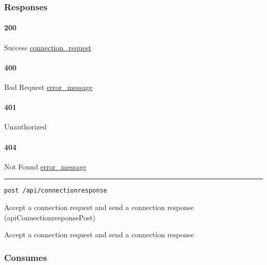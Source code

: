 \hypertarget{responses-162}{%
\subsubsection{Responses}\label{responses-162}}

\hypertarget{section-521}{%
\paragraph{200}\label{section-521}}

Success \protect\hyperlink{connection_request}{connection\_request}

\hypertarget{section-522}{%
\paragraph{400}\label{section-522}}

Bad Request \protect\hyperlink{error_message}{error\_message}

\hypertarget{section-523}{%
\paragraph{401}\label{section-523}}

Unauthorized \protect\hyperlink{}{}

\hypertarget{section-524}{%
\paragraph{404}\label{section-524}}

Not Found \protect\hyperlink{error_message}{error\_message}

\begin{center}\rule{0.5\linewidth}{\linethickness}\end{center}

\protect\hypertarget{apiConnectionresponsePost}{}{}

\begin{verbatim}
post /api/connectionresponse
\end{verbatim}

Accept a connection request and send a connection response
({apiConnectionresponsePost})

Accept a connection request and send a connection response

\hypertarget{consumes-51}{%
\subsubsection{Consumes}\label{consumes-51}}

